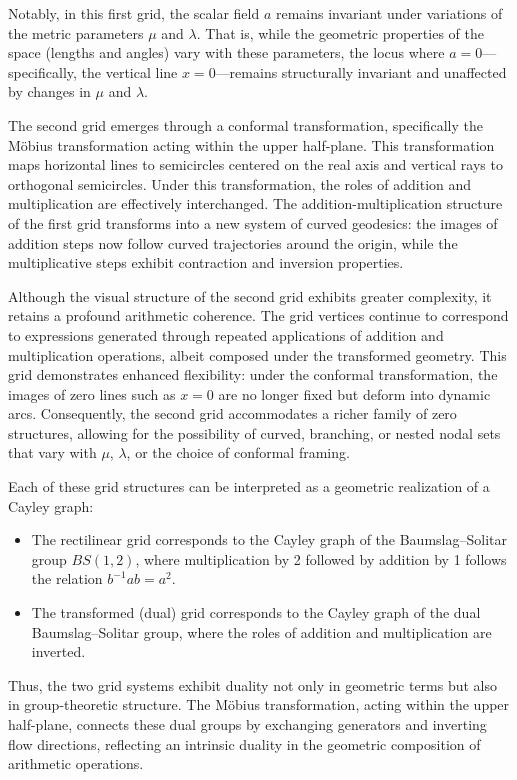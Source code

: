 Notably, in this first grid, the scalar field $a$ remains invariant under variations of the metric parameters $\mu$ and $\lambda$. That is, while the geometric properties of the space (lengths and angles) vary with these parameters, the locus where $a=0$—specifically, the vertical line $x=0$—remains structurally invariant and unaffected by changes in $\mu$ and $\lambda$.

The second grid emerges through a conformal transformation, specifically the Möbius transformation acting within the upper half-plane. This transformation maps horizontal lines to semicircles centered on the real axis and vertical rays to orthogonal semicircles. Under this transformation, the roles of addition and multiplication are effectively interchanged. The addition-multiplication structure of the first grid transforms into a new system of curved geodesics: the images of addition steps now follow curved trajectories around the origin, while the multiplicative steps exhibit contraction and inversion properties.

Although the visual structure of the second grid exhibits greater complexity, it retains a profound arithmetic coherence. The grid vertices continue to correspond to expressions generated through repeated applications of addition and multiplication operations, albeit composed under the transformed geometry. This grid demonstrates enhanced flexibility: under the conformal transformation, the images of zero lines such as $x=0$ are no longer fixed but deform into dynamic arcs. Consequently, the second grid accommodates a richer family of zero structures, allowing for the possibility of curved, branching, or nested nodal sets that vary with $\mu$, $\lambda$, or the choice of conformal framing.

Each of these grid structures can be interpreted as a geometric realization of a Cayley graph:

\begin{itemize}
\item The rectilinear grid corresponds to the Cayley graph of the Baumslag–Solitar group $BS(1,2)$, where multiplication by 2 followed by addition by 1 follows the relation $b^{-1}ab = a^2$.
\item The transformed (dual) grid corresponds to the Cayley graph of the dual Baumslag–Solitar group, where the roles of addition and multiplication are inverted.
\end{itemize}

Thus, the two grid systems exhibit duality not only in geometric terms but also in group-theoretic structure. The Möbius transformation, acting within the upper half-plane, connects these dual groups by exchanging generators and inverting flow directions, reflecting an intrinsic duality in the geometric composition of arithmetic operations.

